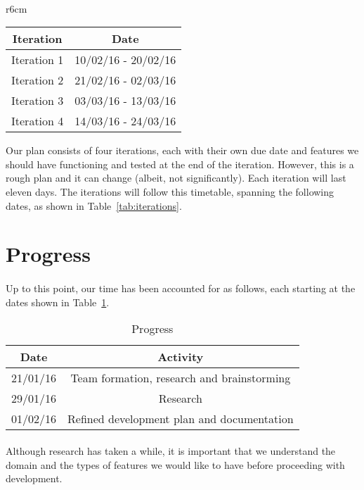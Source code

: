 \documentclass[11pt, a4paper]{article}
\begin{document}
\paragraph{}
\begin{wraptable}{r}{6cm}
\centering
    \begin{tabular}{|c|c|}
	\hline
	\textbf{Iteration} & \textbf{Date}  \\ \hline
	Iteration 1 & 10/02/16 - 20/02/16 \\ \hline
	Iteration 2 & 21/02/16 - 02/03/16 \\ \hline
	Iteration 3 & 03/03/16 - 13/03/16 \\ \hline
	Iteration 4 & 14/03/16 - 24/03/16 \\ \hline
 \end{tabular}
\caption{Iteration Cycles}
\label{tab:iterations}
\end{wraptable}
Our plan consists of four iterations, each with their own due date and features we should have functioning and tested at the end of the iteration. However, this is a rough plan and it can change (albeit, not significantly). Each iteration will last eleven days. The iterations will follow this timetable, spanning the following dates, as shown in Table~\ref{tab:iterations}.

\section{Progress}\label{prog}
\paragraph{}
Up to this point, our time has been accounted for as follows, each starting at the dates shown in Table~\ref{tab:progress}.
\begin{table}[!htbp]
\centering
\begin{tabular}{|c|c|}
	\hline
	\textbf{Date} & \textbf{Activity}  \\ \hline
	21/01/16 & Team formation, research and brainstorming \\ \hline
	29/01/16 & Research \\ \hline
	01/02/16 & Refined development plan and documentation \\ \hline
\end{tabular}
\caption{Progress}
\label{tab:progress}
\end{table}
\paragraph{}
Although research has taken a while, it is important that we understand the domain and the types of features we would like to have before proceeding with development.
\end{document}
